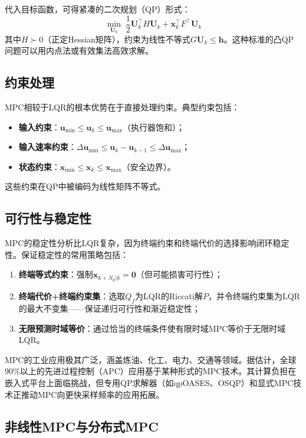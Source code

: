 代入目标函数，可得紧凑的二次规划（QP）形式：
\[
\min_{\mathbf{U}_k}\; \frac{1}{2}\mathbf{U}_k^{\top}H\mathbf{U}_k + \mathbf{x}_k^{\top}F^{\top}\mathbf{U}_k
\]
其中\(H \succ 0\)（正定Hessian矩阵），约束为线性不等式\(G\mathbf{U}_k \le \mathbf{h}\)。这种标准的凸QP问题可以用内点法或有效集法高效求解。

\subsection{约束处理}

MPC相较于LQR的根本优势在于直接处理约束。典型约束包括：
\begin{itemize}
\item \textbf{输入约束}：\(\mathbf{u}_{\min} \le \mathbf{u}_k \le \mathbf{u}_{\max}\)（执行器饱和）；
\item \textbf{输入速率约束}：\(\Delta\mathbf{u}_{\min} \le \mathbf{u}_k - \mathbf{u}_{k-1} \le \Delta\mathbf{u}_{\max}\)；
\item \textbf{状态约束}：\(\mathbf{x}_{\min} \le \mathbf{x}_k \le \mathbf{x}_{\max}\)（安全边界）。
\end{itemize}
这些约束在QP中被编码为线性矩阵不等式。

\subsection{可行性与稳定性}

MPC的稳定性分析比LQR复杂，因为终端约束和终端代价的选择影响闭环稳定性。保证稳定性的常用策略包括：
\begin{enumerate}
\item \textbf{终端等式约束}：强制\(\mathbf{x}_{k+N_p|k} = \mathbf{0}\)（但可能损害可行性）；
\item \textbf{终端代价+终端约束集}：选取\(Q_f\)为LQR的Riccati解\(P\)，并令终端约束集为LQR的最大不变集——保证递归可行性和渐近稳定性；
\item \textbf{无限预测时域等价}：通过恰当的终端条件使有限时域MPC等价于无限时域LQR。
\end{enumerate}

\begin{remark}
MPC的工业应用极其广泛，涵盖炼油、化工、电力、交通等领域。据估计，全球90\%以上的先进过程控制（APC）应用基于某种形式的MPC技术。其计算负担在嵌入式平台上面临挑战，但专用QP求解器（如qpOASES、OSQP）和显式MPC技术正推动MPC向更快采样频率的应用拓展。
\end{remark}

\subsection{非线性MPC与分布式MPC}

